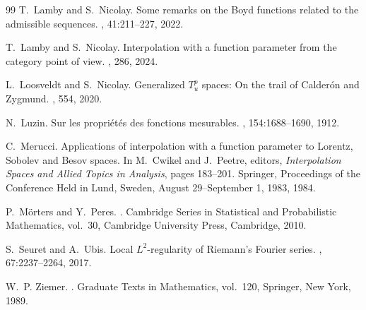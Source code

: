 \documentclass[a4paper,10pt]{article}
\theoremstyle{thmstyleone}%
\theoremstyle{thmstyletwo}%
\theoremstyle{thmstylethree}%
\begin{document}
\begin{thebibliography}{99}
T.~Lamby and S.~Nicolay.
\newblock Some remarks on the {B}oyd functions related to the admissible sequences.
, 41:211--227, 2022.

T.~Lamby and S.~Nicolay.
\newblock Interpolation with a function parameter from the category point of view.
, 286, 2024.

L.~Loosveldt and S.~Nicolay.
\newblock Generalized {$T_u^p$} spaces: On the trail of {C}alder{\'o}n and {Z}ygmund.
, 554, 2020.

N.~Luzin.
\newblock Sur les propri{\'e}t{\'e}s des fonctions mesurables.
, 154:1688--1690, 1912.

C.~Merucci.
\newblock Applications of interpolation with a function parameter to {L}orentz, {S}obolev and {B}esov spaces.
\newblock In M.~Cwikel and J.~Peetre, editors, {\em Interpolation Spaces and Allied Topics in Analysis}, pages 183--201. Springer, Proceedings of the Conference Held in Lund, Sweden, August 29--September 1, 1983, 1984.

P.~M{\"o}rters and Y.~Peres.
.
\newblock Cambridge Series in Statistical and Probabilistic Mathematics, vol.~30, Cambridge University Press, Cambridge, 2010.

S.~Seuret and A.~Ubis.
\newblock Local {$L^2$}-regularity of {R}iemann's {F}ourier series.
, 67:2237--2264, 2017.

W.~P. Ziemer.
.
\newblock Graduate Texts in Mathematics, vol.~120, Springer, New York, 1989.


\end{thebibliography}
\end{document}
